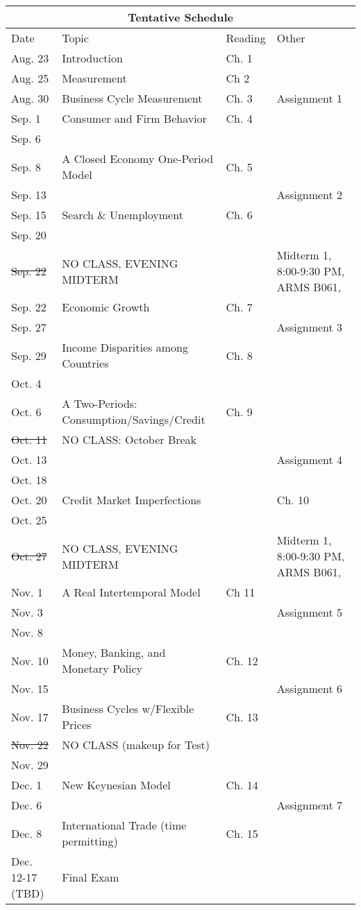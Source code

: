 \documentclass[a4paper]{article}
\begin{document}
\begin{table}[ht!]
\centering
\begin{tabular}{llll}
\multicolumn{4}{c}{Tentative Schedule}\\
\hline\hline
 Date & Topic & Reading & Other \\
\hline
Aug. 23 & Introduction & Ch. 1 &  \\
Aug. 25 & Measurement & Ch 2 &  \\
Aug. 30 & Business Cycle Measurement  & Ch. 3 & Assignment 1 \\
Sep. 1 & Consumer and Firm Behavior & Ch. 4 &  \\
Sep. 6 &  &  &  \\
Sep. 8 & A Closed Economy One-Period Model & Ch. 5 &  \\
Sep. 13 &  &  & Assignment 2 \\
Sep. 15 & Search \& Unemployment & Ch. 6 &  \\
Sep. 20 &  &  &  \\
\sout{Sep. 22} & NO CLASS, EVENING MIDTERM & & Midterm 1, 8:00-9:30 PM, ARMS B061, \\
Sep. 22 & Economic Growth & Ch. 7  &  \\
Sep. 27 &  &  &  Assignment 3\\
Sep. 29 & Income Disparities among Countries & Ch. 8 &  \\
Oct. 4 &  &  &  \\
Oct. 6 & A Two-Periods: Consumption/Savings/Credit & Ch. 9\\
\sout{Oct. 11} & NO CLASS: October Break &  &  \\
Oct. 13 &  &  &  Assignment 4\\
Oct. 18 &  &  &  \\
Oct. 20 & Credit Market Imperfections &  & Ch. 10 \\
Oct. 25 &  &  &  \\
\sout{Oct. 27} & NO CLASS, EVENING MIDTERM & & Midterm 1, 8:00-9:30 PM, ARMS B061, \\
Nov. 1 & A Real Intertemporal Model & Ch 11 &  \\
Nov. 3 &  &  & Assignment 5 \\
Nov. 8 &  &  &  \\
Nov. 10 & Money, Banking, and Monetary Policy & Ch. 12 &  \\
Nov. 15 &  &  &  Assignment 6\\
Nov. 17 & Business Cycles w/Flexible Prices  & Ch. 13 &  \\
\sout{Nov. 22} & NO CLASS (makeup for Test)  &  &  \\
Nov. 29 &  &  &  \\
Dec. 1 & New Keynesian Model  & Ch. 14 &\\
Dec. 6 &  &  &  Assignment 7\\
Dec. 8 & International Trade (time permitting) &  Ch. 15 &\\
Dec. 12-17 (TBD) & Final Exam &  &  \\
\end{tabular}
\end{table}
\end{document}
